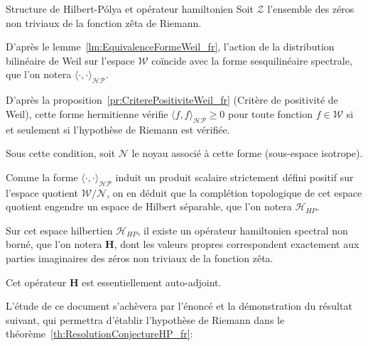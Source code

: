 \documentclass[Riemann_Hypothesis.tex]{subfiles}
\begin{document}
\begin{lemma}[label=lm:ConstructionMetriqueHP_fr_intro]{Structure de Hilbert-Pólya et opérateur hamiltonien}
    Soit $\mathcal{Z}$ l'ensemble des zéros non triviaux de la fonction zêta de Riemann.\par
    D'après le lemme~\ref{lm:EquivalenceFormeWeil_fr},
    l'action de la distribution bilinéaire de Weil sur l'espace $\mathcal{W}$
    coïncide avec la forme sesquilinéaire spectrale, que l'on
    notera $\langle \cdot, \cdot \rangle_{\mathcal{HP}}$. \par
    D'après la proposition~\ref{pr:CriterePositiviteWeil_fr} (Critère de positivité
    de Weil), cette forme hermitienne vérifie $\langle f, f \rangle_{\mathcal{HP}}
    \geq 0$ pour toute fonction $f \in \mathcal{W}$ si et seulement si l'hypothèse
    de Riemann est vérifiée. \par
    Sous cette condition, soit $\mathcal{N}$ le noyau associé à cette forme
    (sous-espace isotrope). \par
    Comme la forme $\langle \cdot, \cdot \rangle_{\mathcal{HP}}$ induit un produit
    scalaire strictement défini positif sur l'espace quotient
    $\mathcal{W} / \mathcal{N}$, on en déduit que la complétion topologique de cet
    espace quotient engendre un espace de Hilbert séparable, que l'on notera
    $\mathcal{H}_{HP}$. \par
    Sur cet espace hilbertien $\mathcal{H}_{HP}$, il existe un opérateur
    hamiltonien spectral non borné, que l'on notera $\mathbf{H}$, dont les
    valeurs propres correspondent exactement aux parties imaginaires des zéros
    non triviaux de la fonction zêta. \par
    Cet opérateur $\mathbf{H}$ est essentiellement auto-adjoint.
\end{lemma}

L'étude de ce document s'achèvera par l'énoncé et la démonstration du résultat suivant, 
qui permettra d'établir l'hypothèse de Riemann dans le théorème~\ref{th:ResolutionConjectureHP_fr}:
\end{document}
